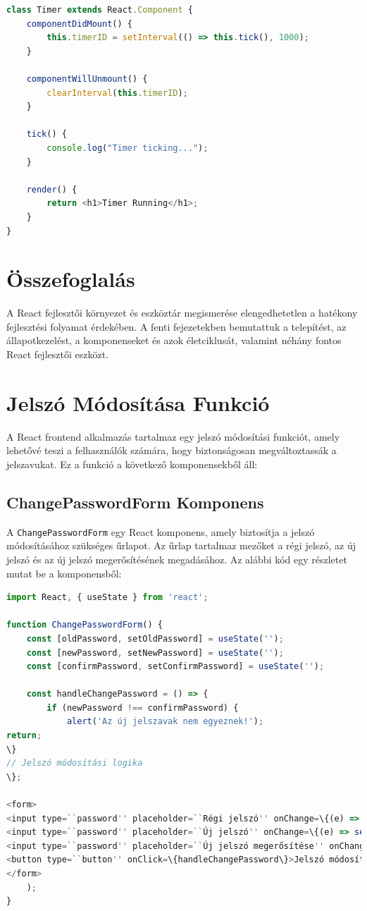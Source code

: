 \documentclass[colorlinks]{thesis-kando}
\theoremstyle{definition}
\theoremstyle{remark}
\begin{document}
\begin{lstlisting}[language=JavaScript]
class Timer extends React.Component {
    componentDidMount() {
        this.timerID = setInterval(() => this.tick(), 1000);
    }

    componentWillUnmount() {
        clearInterval(this.timerID);
    }

    tick() {
        console.log("Timer ticking...");
    }

    render() {
        return <h1>Timer Running</h1>;
    }
}
\end{lstlisting}

\section{Összefoglalás}
A React fejlesztői környezet és eszköztár megismerése elengedhetetlen a hatékony fejlesztési folyamat érdekében. A fenti fejezetekben bemutattuk a telepítést, az állapotkezelést, a komponenseket és azok életciklusát, valamint néhány fontos React fejlesztői eszközt.

\section{Jelszó Módosítása Funkció}
A React frontend alkalmazás tartalmaz egy jelszó módosítási funkciót, amely lehetővé teszi a felhasználók számára, hogy biztonságosan megváltoztassák a jelszavukat. Ez a funkció a következő komponensekből áll:

\subsection{ChangePasswordForm Komponens}
A \texttt{ChangePasswordForm} egy React komponens, amely biztosítja a jelszó módosításához szükséges űrlapot. Az űrlap tartalmaz mezőket a régi jelszó, az új jelszó és az új jelszó megerősítésének megadásához. Az alábbi kód egy részletet mutat be a komponensből:

\begin{lstlisting}[language=JavaScript]
import React, { useState } from 'react';

function ChangePasswordForm() {
    const [oldPassword, setOldPassword] = useState('');
    const [newPassword, setNewPassword] = useState('');
    const [confirmPassword, setConfirmPassword] = useState('');

    const handleChangePassword = () => {
        if (newPassword !== confirmPassword) {
            alert('Az új jelszavak nem egyeznek!');
return;
\}
// Jelszó módosítási logika
\};

<form>
<input type=``password'' placeholder=``Régi jelszó'' onChange=\{(e) => setOldPassword(e.target.value)\} />
<input type=``password'' placeholder=``Új jelszó'' onChange=\{(e) => setNewPassword(e.target.value)\} />
<input type=``password'' placeholder=``Új jelszó megerősítése'' onChange=\{(e) => setConfirmPassword(e.target.value)\} />
<button type=``button'' onClick=\{handleChangePassword\}>Jelszó módosítása</button>
</form>
    );
}
\end{lstlisting}
\end{document}
